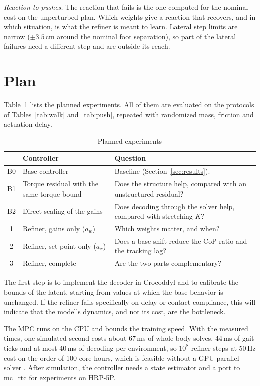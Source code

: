 \documentclass[conference]{IEEEtran}
\begin{document}
\emph{Reaction to pushes.} The reaction that fails is the one computed for the nominal cost on the unperturbed plan.
Which weights give a reaction that recovers, and in which situation, is what the refiner is meant to learn.
Lateral step limits are narrow ($\pm3.5$\,cm around the nominal foot separation), so part of the lateral failures need a different step and are outside its reach.

\section{Plan}
\label{sec:plan}

Table~\ref{tab:exp} lists the planned experiments.
All of them are evaluated on the protocols of Tables~\ref{tab:walk} and~\ref{tab:push}, repeated with randomized mass, friction and actuation delay.

\begin{table}[t]
\caption{Planned experiments}
\label{tab:exp}
\centering
\setlength{\tabcolsep}{3pt}
\begin{tabular}{@{}cp{}p{}@{}}
\toprule
 & Controller & Question\\
\midrule
B0 & Base controller & Baseline (Section~\ref{sec:results}).\\
B1 & Torque residual with the same torque bound & Does the structure help, compared with an unstructured residual?\\
B2 & Direct scaling of the gains & Does decoding through the solver help, compared with stretching $K$?\\
1 & Refiner, gains only ($a_w$) & Which weights matter, and when?\\
2 & Refiner, set-point only ($a_x$) & Does a base shift reduce the CoP ratio and the tracking lag?\\
3 & Refiner, complete & Are the two parts complementary?\\
\bottomrule
\end{tabular}
\end{table}

The first step is to implement the decoder in Crocoddyl and to calibrate the bounds of the latent, starting from values at which the base behavior is unchanged.
If the refiner fails specifically on delay or contact compliance, this will indicate that the model's dynamics, and not its cost, are the bottleneck.

The MPC runs on the CPU and bounds the training speed.
With the measured times, one simulated second costs about 67\,ms of whole-body solves, 44\,ms of gait ticks and at most 40\,ms of decoding per environment, so $10^8$ refiner steps at 50\,Hz cost on the order of 100 core-hours, which is feasible without a GPU-parallel solver \cite{jeon2025residualmpc}.
After simulation, the controller needs a state estimator and a port to mc\_rtc for experiments on HRP-5P.
\end{document}
